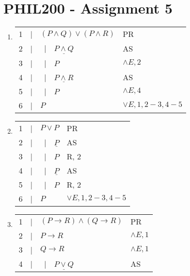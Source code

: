 \documentclass{article}
\newcommand{\asbar}{\ |\ \ }
\begin{document}
\section*{PHIL200 - Assignment 5}

\begin{enumerate}
    \item \begin{tabular}{llp{5cm}l}
              1 & | & \underline{$(P\land Q)\lor(P\land R)$} & PR                 \\
              2 & | & \asbar $\underline{P\land Q}$          & AS                 \\
              3 & | & \asbar $P$                             & $\land E,2$        \\
              4 & | & \asbar $\underline{P\land R}$          & AS                 \\
              5 & | & \asbar $P$                             & $\land E,4$        \\
              6 & | & $P$                                    & $\lor E,1,2-3,4-5$ \\
              \hline
          \end{tabular}
    \item \begin{tabular}{llp{5cm}l}
              1 & | & \underline{$P\lor P$}  & PR                 \\
              2 & | & \asbar $\underline{P}$ & AS                 \\
              3 & | & \asbar $P$             & R, 2               \\
              4 & | & \asbar $\underline{P}$ & AS                 \\
              5 & | & \asbar $P$             & R, 2               \\
              6 & | & $P$                    & $\lor E,1,2-3,4-5$ \\
              \hline
          \end{tabular}
    \item \begin{tabular}{llp{5cm}l}
              1  & | & \underline{$(P\to R)\land(Q\to R)$} & PR                 \\
              2  & | & $P \to R$                           & $\land E,1$        \\
              3  & | & $Q \to R$                           & $\land E,1$        \\
              4  & | & \asbar $\underline{P\lor Q}$        & AS                 \\

\end{tabular}
\end{enumerate}
\end{document}

